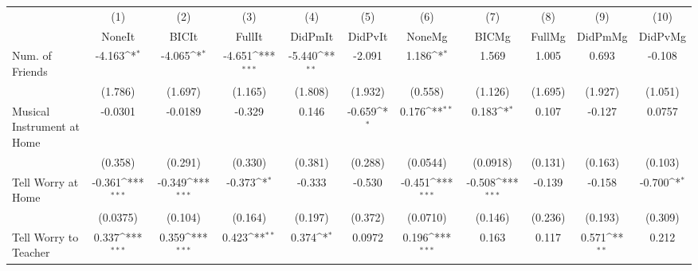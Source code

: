 {
\def\sym#1{\ifmmode^{#1}\else\(^{#1}\)\fi}
\begin{tabular}{l*{10}{c}}
\toprule
            &\multicolumn{1}{c}{(1)}&\multicolumn{1}{c}{(2)}&\multicolumn{1}{c}{(3)}&\multicolumn{1}{c}{(4)}&\multicolumn{1}{c}{(5)}&\multicolumn{1}{c}{(6)}&\multicolumn{1}{c}{(7)}&\multicolumn{1}{c}{(8)}&\multicolumn{1}{c}{(9)}&\multicolumn{1}{c}{(10)}\\
            &\multicolumn{1}{c}{NoneIt}&\multicolumn{1}{c}{BICIt}&\multicolumn{1}{c}{FullIt}&\multicolumn{1}{c}{DidPmIt}&\multicolumn{1}{c}{DidPvIt}&\multicolumn{1}{c}{NoneMg}&\multicolumn{1}{c}{BICMg}&\multicolumn{1}{c}{FullMg}&\multicolumn{1}{c}{DidPmMg}&\multicolumn{1}{c}{DidPvMg}\\
\midrule
Num. of Friends&      -4.163\sym{*}  &      -4.065\sym{*}  &      -4.651\sym{***}&      -5.440\sym{**} &      -2.091         &       1.186\sym{*}  &       1.569         &       1.005         &       0.693         &      -0.108         \\
            &     (1.786)         &     (1.697)         &     (1.165)         &     (1.808)         &     (1.932)         &     (0.558)         &     (1.126)         &     (1.695)         &     (1.927)         &     (1.051)         \\
\addlinespace
Musical Instrument at Home&     -0.0301         &     -0.0189         &      -0.329         &       0.146         &      -0.659\sym{*}  &       0.176\sym{**} &       0.183\sym{*}  &       0.107         &      -0.127         &      0.0757         \\
            &     (0.358)         &     (0.291)         &     (0.330)         &     (0.381)         &     (0.288)         &    (0.0544)         &    (0.0918)         &     (0.131)         &     (0.163)         &     (0.103)         \\
\addlinespace
Tell Worry at Home&      -0.361\sym{***}&      -0.349\sym{***}&      -0.373\sym{*}  &      -0.333         &      -0.530         &      -0.451\sym{***}&      -0.508\sym{***}&      -0.139         &      -0.158         &      -0.700\sym{*}  \\
            &    (0.0375)         &     (0.104)         &     (0.164)         &     (0.197)         &     (0.372)         &    (0.0710)         &     (0.146)         &     (0.236)         &     (0.193)         &     (0.309)         \\
\addlinespace
Tell Worry to Teacher&       0.337\sym{***}&       0.359\sym{***}&       0.423\sym{**} &       0.374\sym{*}  &      0.0972         &       0.196\sym{***}&       0.163         &       0.117         &       0.571\sym{**} &       0.212         \\

\end{tabular}}
